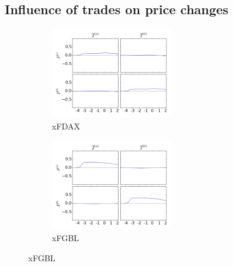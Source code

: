 \documentclass[a4paper,11pt]{article}
\begin{document}
\subsection{Influence of trades on price changes}
\label{TP}
\begin{figure}[H]
        \begin{subfigure}[b]{0.45\textwidth}
                \includegraphics[width=\textwidth,height=40mm]{xFDAXPA_PB_TA_TB_LA_LB_CA_CB__TATB-_PAPBcausality.png}
                \caption{xFDAX}
        \end{subfigure}
        \begin{subfigure}[b]{0.45\textwidth}
                \includegraphics[width=\textwidth,height=40mm]{xFGBLPA_PB_TA_TB_LA_LB_CA_CB__TATB-_PAPBcausality.png}
                \caption{xFGBL}
        \end{subfigure}
\end{figure}
\end{document}
